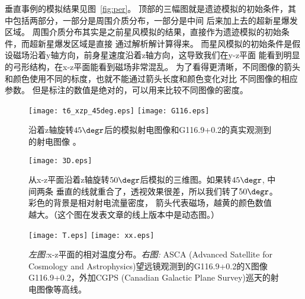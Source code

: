 垂直事例的模拟结果见图~\ref{fig:per}。
顶部的三幅图就是遗迹模拟的初始条件，其中包括两部分，一部分是周围介质分布，一部分是中间
后来加上去的超新星爆发区域。
周围介质分布其实是之前星风模拟的结果，直接作为遗迹模拟的初始条件，而超新星爆发区域是直接
通过解析解计算得来。
而星风模拟的初始条件是假设磁场沿着y轴方向，前身星速度沿着z轴方向，这导致我们在y-z平面
能看到明显的弓形结构，在x-z平面能看到磁场非常混乱。
为了看得更清晰，不同图像的箭头和颜色使用不同的标度，也就不能通过箭头长度和颜色变化对比
不同图像的相应参数。
但是标注的数值是绝对的，可以用来比较不同图像的密度。

\begin{figure}
    \centering
    \texttt{[image: t6\_xzp\_45deg.eps]}
    \texttt{[image: G116.eps]}
    \caption{沿着z轴旋转$45\degr$后的模拟射电图像和G116.9+0.2的真实观测到的射电图像
    \citep{West2016,Tian2006}。}
\label{fig:45deg}
\end{figure}

\begin{figure*}
    \centering
    \texttt{[image: 3D.eps]}
    \caption{从x-z平面沿着z轴旋转$50\degr$后模拟的三维图。如果转$45\degr$, 中间两条
    垂直的线就重合了，透视效果很差，所以我们转了$50\degr$。彩色的背景是相对射电流量密度，
    箭头代表磁场，越黄的颜色数值越大。（这个图在发表文章的线上版本中是动态图。）}
\label{fig:3D}
\end{figure*}

\begin{figure*}
    \centering
    \texttt{[image: T.eps]}
    \texttt{[image: xx.eps]}
    \caption{\textit{左图:}x-z平面的相对温度分布。\textit{右图:} ASCA (Advanced Satellite for
    Cosmology and Astrophysics)望远镜观测到的G116.9+0.2的X图像G116.9+0.2，外加CGPS
     (Canadian Galactic Plane Survey)巡天的射电图像等高线\citep{Pannuti2010}。}
\label{fig:X}
\end{figure*}

